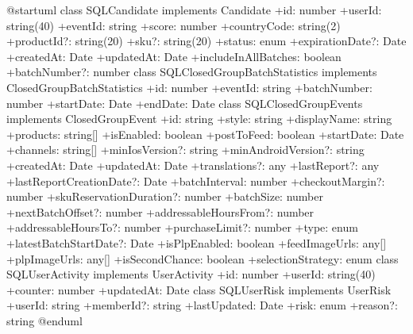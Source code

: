 \begin{plantuml}

@startuml
class SQLCandidate implements Candidate {
    +id: number
    +userId: string(40)
    +eventId: string
    +score: number
    +countryCode: string(2)
    +productId?: string(20)
    +sku?: string(20)
    +status: enum
    +expirationDate?: Date
    +createdAt: Date
    +updatedAt: Date
    +includeInAllBatches: boolean
    +batchNumber?: number
}
class SQLClosedGroupBatchStatistics implements ClosedGroupBatchStatistics {
    +id: number
    +eventId: string
    +batchNumber: number
    +startDate: Date
    +endDate: Date
}
class SQLClosedGroupEvents implements ClosedGroupEvent {
    +id: string
    +style: string
    +displayName: string
    +products: string[]
    +isEnabled: boolean
    +postToFeed: boolean
    +startDate: Date
    +channels: string[]
    +minIosVersion?: string
    +minAndroidVersion?: string
    +createdAt: Date
    +updatedAt: Date
    +translations?: any
    +lastReport?: any
    +lastReportCreationDate?: Date
    +batchInterval: number
    +checkoutMargin?: number
    +skuReservationDuration?: number
    +batchSize: number
    +nextBatchOffset?: number
    +addressableHoursFrom?: number
    +addressableHoursTo?: number
    +purchaseLimit?: number
    +type: enum
    +latestBatchStartDate?: Date
    +isPlpEnabled: boolean
    +feedImageUrls: any[]
    +plpImageUrls: any[]
    +isSecondChance: boolean
    +selectionStrategy: enum
}
class SQLUserActivity implements UserActivity {
    +id: number
    +userId: string(40)
    +counter: number
    +updatedAt: Date
}
class SQLUserRisk implements UserRisk {
    +userId: string
    +memberId?: string
    +lastUpdated: Date
    +risk: enum
    +reason?: string
}
@enduml

\end{plantuml}

